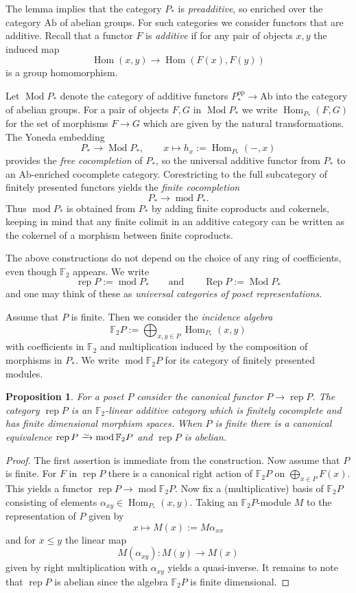 \documentclass[a4paper]{amsart}
\theoremstyle{plain}
\newtheorem{prop}[thm]{Proposition}
\theoremstyle{definition}
\theoremstyle{remark}
\numberwithin{equation}{section}
\newcommand{\Hom}{\operatorname{Hom}}
\renewcommand{\mod}{\operatorname{mod}}
\newcommand{\Mod}{\operatorname{Mod}}
\newcommand{\rep}{\operatorname{rep}}
\newcommand{\Rep}{\operatorname{Rep}}
\newcommand{\Ab}{\mathrm{Ab}}
\newcommand{\op}{\mathrm{op}}
\newcommand{\iso}{\xrightarrow{\raisebox{-.4ex}[0ex][0ex]{$\scriptstyle{\sim}$}}}
\newcommand{\lto}{\longrightarrow}
\def\bbF{\mathbb F}
\begin{document}
The lemma implies that the category $P_*$ is \emph{preadditive}, so
enriched over the category $\Ab$ of abelian groups. For such
categories we consider functors that are additive. Recall that a
functor $F$ is \emph{additive} if for any pair of objects $x,y$ the
induced map
\[\Hom(x,y)\lto\Hom(F(x),F(y))\] is a group homomorphism.

Let $\Mod P_*$ denote the category of additive functors
$P_*^\op\to\Ab$ into the category of abelian groups. For a pair of
objects $F,G$ in $\Mod P_*$ we write $\Hom_{P_*}(F,G)$ for the set of
morphisms $F\to G$ which are given by the natural transformations.
The Yoneda embedding
\[P_*\lto\Mod P_*,\qquad x\mapsto h_x:=\Hom_{P_*}(-,x)\] provides
the \emph{free cocompletion} of $P_*$, so the universal additive functor
from $P_*$ to an $\Ab$-enriched cocomplete category.  Corestricting to the full
subcategory of finitely presented functors yields the \emph{finite
  cocompletion}
\[P_*\lto \mod P_*.\] 
Thus $\mod P_*$ is obtained from $P_*$ by adding finite coproducts
and cokernels, keeping in mind that any finite colimit in an additive
category can be written as the cokernel of a morphism between finite
coproducts.

The above constructions do not depend on the choice of any ring of
coefficients, even though $\bbF_2$ appears. We write
\[\rep P:=\mod P_*\qquad\text{and}\qquad \Rep P:=\Mod P_*\] and one may
think of these as \emph{universal categories of poset
  representations}.

Assume that $P$ is finite. Then we consider the \emph{incidence
  algebra} 
\[\bbF_2P:=\bigoplus_{x,y\in P}\Hom_{P_*}(x,y)\] with coefficients in
$\bbF_2$ and multiplication induced by the composition of morphisms in
$P_*$.  We write $\mod \bbF_2 P$ for its category of finitely
presented modules.

\begin{prop}\label{pr:cocomplete}
  For a poset $P$ consider the canonical functor $P\to\rep P$. The
  category $\rep P$ is an $\bbF_2$-linear additive category which is
  finitely cocomplete and has finite dimensional morphism spaces. When
  $P$ is finite there is a canonical equivalence
  $\rep P\iso\mod \bbF_2 P$ and $\rep P$ is abelian.
\end{prop}
 
\begin{proof}
  The first assertion is immediate from the construction. Now assume
  that $P$ is finite.  For $F$ in $\rep P$ there is a canonical right
  action of $\bbF_2 P$ on $\bigoplus_{x\in P} F(x)$. This yields a
  functor $\rep P\to\mod \bbF_2 P$. Now fix a (multiplicative) basis
  of $\bbF_2 P$ consisting of elements
  $\alpha_{xy}\in\Hom_{P_*}(x,y)$. Taking an $\bbF_2 P$-module $M$ to the
  representation of $P$ given by \[x\mapsto M(x):=M\alpha_{xx}\] and for
  $x\le y$ the linear map
  \[M(\alpha_{xy})\colon M(y)\lto M(x)\] given by right multiplication with $\alpha_{xy}$ yields a
  quasi-inverse. It remains to note that $\rep P$ is abelian since the
  algebra $\bbF_2 P$ is finite dimensional.
\end{proof}
\end{document}
